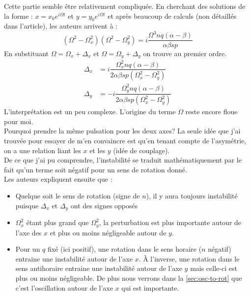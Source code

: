 \documentclass[12pt,a4paper]{article}
\begin{document}
	Cette partie semble être relativement compliquée. En cherchant des solutions de la forme : $x=x_0e^{i\Omega t}$ et $y=y_0e^{i\Omega t}$ et après beaucoup de calculs (non détaillés dans l'article), les auteurs arrivent à :
	\begin{equation}
		(\Omega^2-\Omega_x^2)(\Omega^2-\Omega_y^2)=i\dfrac{\Omega^3 nq(\alpha-\beta)}{\alpha\beta sp}
	\end{equation}
	En substituant $\Omega=\Omega_x+\Delta_x$ et $\Omega=\Omega_y+\Delta_y$ on trouve au premier ordre.
	\begin{align}
	\Delta_x &= i\dfrac{\Omega_x^2 nq(\alpha-\beta)}{2\alpha\beta s p(\Omega_x^2-\Omega_y^2)}\\[2ex]
	\Delta_y &= -i\dfrac{\Omega_y^2 nq(\alpha-\beta)}{2\alpha\beta s p(\Omega_x^2-\Omega_y^2)}
	\end{align}
	L'interprétation est un peu complexe. L'origine du terme $\Omega$ reste encore floue pour moi.\\
	Pourquoi prendre la même pulsation pour les deux axes? La seule idée que j'ai trouvée pour essayer de m'en convaincre est qu'en tenant compte de l'asymétrie, on a une relation liant les $x$ et les $y$ (idée de couplage).\\
	De ce que j'ai pu comprendre, l'instabilité se traduit mathématiquement par le fait qu'un terme soit négatif pour un sens de rotation donné.\\
	Les auteurs expliquent ensuite que :
	\begin{itemize}
		\item Quelque soit le sens de rotation (signe de $n$), il y aura toujours instabilité puisque $\Delta_x$ et $\Delta_y$ ont des signes opposés
		\item $\Omega_x^2$ étant plus grand que $\Omega_y^2$, la perturbation est plus importante autour de l'axe des $x$ et plus ou moins négligeable autour de $y$.
		\item Pour un $q$ fixé (ici positif), une rotation dans le sens horaire ($n$ négatif) entraine une instabilité autour de l'axe $x$. À l'inverse, une rotation dans le sens antihoraire entraine une instabilité autour de l'axe $y$ mais celle-ci est plus ou moins négligeable. De plus nous verrons dans la \autoref{sec:osc-to-rot} que c'est l'oscillation autour de l'axe $x$ qui est importante.
	\end{itemize}
\end{document}

